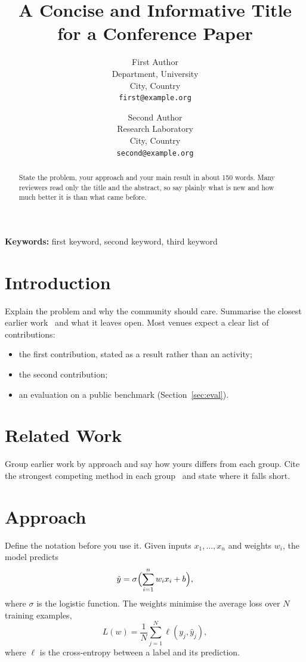 \documentclass[10pt, twocolumn]{article}
\title{\Large\bfseries A Concise and Informative Title for a Conference Paper}
\author{
  First Author \\
  \small Department, University \\
  \small City, Country \\
  \small \texttt{first@example.org}
  \and
  Second Author \\
  \small Research Laboratory \\
  \small City, Country \\
  \small \texttt{second@example.org}
}
\date{}
\begin{document}
\maketitle

\begin{abstract}
State the problem, your approach and your main result in about 150 words.
Many reviewers read only the title and the abstract, so say plainly what
is new and how much better it is than what came before.
\end{abstract}

\noindent\textbf{Keywords:} first keyword, second keyword, third keyword

\section{Introduction}
\label{sec:intro}

Explain the problem and why the community should care. Summarise the
closest earlier work~\cite{surname2023conf, other2022journal} and what it
leaves open. Most venues expect a clear list of contributions:
\begin{itemize}
  \item the first contribution, stated as a result rather than an activity;
  \item the second contribution;
  \item an evaluation on a public benchmark (Section~\ref{sec:eval}).
\end{itemize}

\section{Related Work}
\label{sec:related}

Group earlier work by approach and say how yours differs from each group.
Cite the strongest competing method in each group~\cite{lamport1994}
and state where it falls short.

\section{Approach}
\label{sec:approach}

Define the notation before you use it. Given inputs
$x_1, \dots, x_n$ and weights $w_i$, the model predicts
\begin{equation}
  \hat{y} = \sigma\Bigl( \sum_{i=1}^{n} w_i x_i + b \Bigr) ,
  \label{eq:model}
\end{equation}
where $\sigma$ is the logistic function. The weights minimise the
average loss over $N$ training examples,
\begin{equation}
  L(w) = \frac{1}{N} \sum_{j=1}^{N} \ell(y_j, \hat{y}_j) ,
  \label{eq:loss}
\end{equation}
where $\ell$ is the cross-entropy between a label and its prediction.
\end{document}
